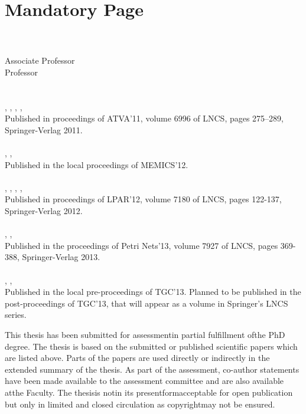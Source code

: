 
\chapter*{Mandatory Page}
 {\large\thesistitle }\\
 {\large\mhms }\\
 {\large Associate Professor \jiris}\\
 {\large Professor \kims}\\ 


\\
\\
\nikolas, \jans, \kims, \mhms, \jiris\\
Published in proceedings of ATVA'11, volume 6996 of LNCS, pages 275--289, Springer-Verlag 2011.\\

\\
\mhms, \kims, \lius\\
Published in the local proceedings of MEMICS'12.\\

\\
\nikolas, \jans, \kims, \mhms, \jiris\\
Published in proceedings of LPAR'12, volume 7180 of LNCS, pages 122-137, Springer-Verlag 2012.\\

\\
\serges, \rolfs, \mhms\\
Published in the proceedings of Petri Nets'13, volume 7927 of LNCS, pages 369-388, Springer-Verlag 2013.\\

\\
\serges, \rolfs, \mhms\\
Published in the local pre-proceedings of TGC'13. Planned to be published in the post-proceedings of TGC'13, that will appear as a volume in Springer's LNCS series.

\vspace{8mm}
This thesis has been submitted for
assessmentin partial fulfillment ofthe PhD degree. The thesis is based on the submitted or
published scientific papers which are listed above. Parts of the papers are used directly or
indirectly in the extended summary of the thesis. As part of the assessment, co-author
statements have been made available to the assessment committee and are also available
atthe Faculty. The thesisis notin its presentformacceptable for open publication but only
in limited and closed circulation as copyrightmay not be ensured.